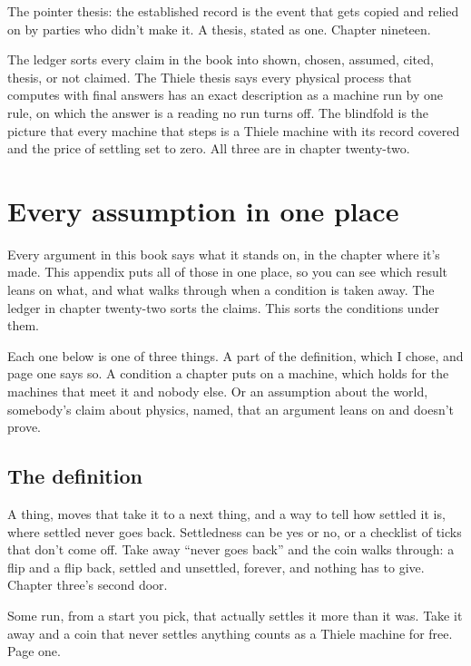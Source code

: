 \documentclass[11pt,twoside]{article}
\theoremstyle{thielethm}
\theoremstyle{thieledef}
\theoremstyle{thieledef}
\theoremstyle{thieledef}
\theoremstyle{thielethm}
\theoremstyle{thieleobs}
\theoremstyle{thielethm}
\begin{document}
The pointer thesis: the established record is the event that gets copied and relied on by parties who didn't make it. A thesis, stated as one. Chapter nineteen.

The ledger sorts every claim in the book into shown, chosen, assumed, cited, thesis, or not claimed. The Thiele thesis says every physical process that computes with final answers has an exact description as a machine run by one rule, on which the answer is a reading no run turns off. The blindfold is the picture that every machine that steps is a Thiele machine with its record covered and the price of settling set to zero. All three are in chapter twenty-two.

\section{Every assumption in one place}
\label{sec:assumptions}

Every argument in this book says what it stands on, in the chapter where it's made. This appendix puts all of those in one place, so you can see which result leans on what, and what walks through when a condition is taken away. The ledger in chapter twenty-two sorts the claims. This sorts the conditions under them.

Each one below is one of three things. A part of the definition, which I chose, and page one says so. A condition a chapter puts on a machine, which holds for the machines that meet it and nobody else. Or an assumption about the world, somebody's claim about physics, named, that an argument leans on and doesn't prove.

\subsection{The definition}

A thing, moves that take it to a next thing, and a way to tell how settled it is, where settled never goes back. Settledness can be yes or no, or a checklist of ticks that don't come off. Take away ``never goes back'' and the coin walks through: a flip and a flip back, settled and unsettled, forever, and nothing has to give. Chapter three's second door.

Some run, from a start you pick, that actually settles it more than it was. Take it away and a coin that never settles anything counts as a Thiele machine for free. Page one.
\end{document}
